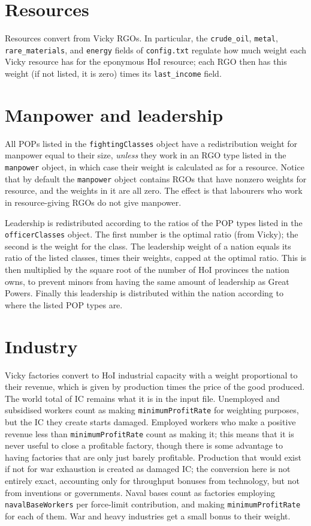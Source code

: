 \documentclass[12pt,ebook,oneside]{book}
\begin{document}
\section{Resources}

Resources convert from Vicky RGOs. In particular, the
\texttt{crude\_oil}, \texttt{metal}, \texttt{rare\_materials}, and
\texttt{energy} fields of \texttt{config.txt} regulate how much weight
each Vicky resource has for the eponymous HoI resource; each RGO then
has this weight (if not listed, it is zero) times its
\texttt{last\_income} field. 

\section{Manpower and leadership}

All POPs listed in the \texttt{fightingClasses} object have a
redistribution weight for manpower equal to their size, \emph{unless}
they work in an RGO type listed in the \texttt{manpower} object, in
which case their weight is calculated as for a resource. Notice that
by default the \texttt{manpower} object contains RGOs that have
nonzero weights for resource, and the weights in it are all zero. The
effect is that labourers who work in resource-giving RGOs do not give
manpower. 

Leadership is redistributed according to the ratios of the POP types
listed in the \texttt{officerClasses} object. The first number is the
optimal ratio (from Vicky); the second is the weight for the
class. The leadership weight of a nation equals its ratio of the
listed classes, times their weights, capped at the optimal ratio. This
is then multiplied by the square root of the number of HoI provinces
the nation owns, to prevent minors from having the same amount of
leadership as Great Powers. Finally this leadership is distributed
within the nation according to where the listed POP types are. 

\section{Industry} 

Vicky factories convert to HoI industrial capacity with a weight
proportional to their revenue, which is given by production times the
price of the good produced. The world total of IC remains what it
is in the input file. Unemployed and subsidised workers count as
making \texttt{minimumProfitRate} for weighting purposes, but the IC
they create starts damaged. Employed workers who make a positive
revenue less than \texttt{minimumProfitRate} count as making it; this
means that it is never useful to close a profitable factory, though
there is some advantage to having factories that are only just barely
profitable. Production that would exist if not for war exhaustion is
created as damaged IC; the conversion here is not entirely exact,
accounting only for throughput bonuses from technology, but not from
inventions or governments. Naval bases count as factories employing
\texttt{navalBaseWorkers} per force-limit contribution, and making
\texttt{minimumProfitRate} for each of them. War and heavy industries
get a small bonus to their weight. 
\end{document}
